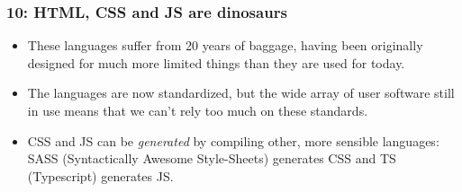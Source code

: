 \documentclass{beamer}
\begin{document}
\begin{frame}
  \frametitle{10: HTML, CSS and JS are dinosaurs}

  \begin{itemize}
  \item These languages suffer from 20 years of baggage, having been
    originally designed for much more limited things than they are
    used for today.
  \item The languages are now standardized, but the wide array of user
    software still in use means that we can't rely too much on these
    standards.
  \item CSS and JS can be \emph{generated} by compiling other, more
    sensible languages: SASS (Syntactically Awesome Style-Sheets)
    generates CSS and TS (Typescript) generates JS.
  \end{itemize}
\end{frame}
\end{document}
